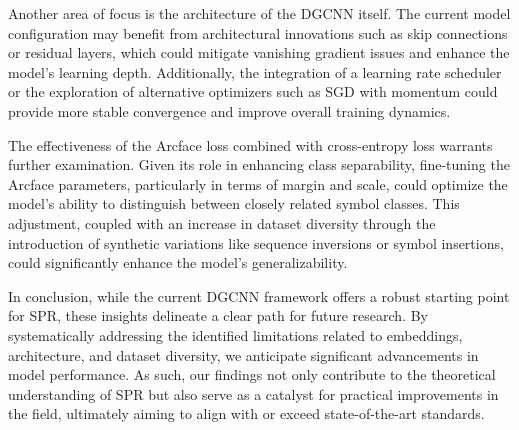 \documentclass{article}
\begin{document}
Another area of focus is the architecture of the DGCNN itself. The current model configuration may benefit from architectural innovations such as skip connections or residual layers, which could mitigate vanishing gradient issues and enhance the model's learning depth. Additionally, the integration of a learning rate scheduler or the exploration of alternative optimizers such as SGD with momentum could provide more stable convergence and improve overall training dynamics.

The effectiveness of the Arcface loss combined with cross-entropy loss warrants further examination. Given its role in enhancing class separability, fine-tuning the Arcface parameters, particularly in terms of margin and scale, could optimize the model's ability to distinguish between closely related symbol classes. This adjustment, coupled with an increase in dataset diversity through the introduction of synthetic variations like sequence inversions or symbol insertions, could significantly enhance the model's generalizability.

In conclusion, while the current DGCNN framework offers a robust starting point for SPR, these insights delineate a clear path for future research. By systematically addressing the identified limitations related to embeddings, architecture, and dataset diversity, we anticipate significant advancements in model performance. As such, our findings not only contribute to the theoretical understanding of SPR but also serve as a catalyst for practical improvements in the field, ultimately aiming to align with or exceed state-of-the-art standards.
\end{document}
